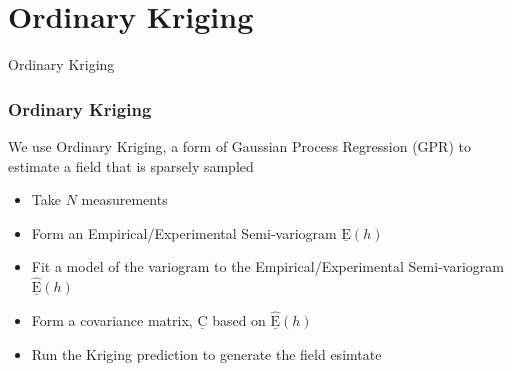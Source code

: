 \documentclass[professionalfont,10pt]{beamer}
\begin{document}
	\section{Ordinary Kriging}
	\begin{frame}[t]{Ordinary Kriging}
		\frametitle{Ordinary Kriging}
		\hskip-0.75cm
		\begin{minipage}[t]{0.2\linewidth}\vspace{-0.5cm}
			\tiny\tableofcontents[currentsection,currentsubsection,hideothersubsections,subsectionstyle=show/shaded]
		\end{minipage}
		\hfill%
		\begin{minipage}[t]{0.86\linewidth}\vspace{-0.5cm}
			We use Ordinary Kriging, a form of Gaussian Process Regression (GPR) to estimate a field that is sparsely sampled
			\begin{itemize}
				\item Take $N$ measurements
				\item Form an Empirical/Experimental Semi-variogram $\underline{\text{E}}(h)$
				\item Fit a model of the variogram to the Empirical/Experimental Semi-variogram $\underline{\hat{\text{E}}}(h)$
				\item Form a covariance matrix, $\underline{\text{C}}$ based on $\hat{\underline{\text{E}}}(h)$
				\item Run the Kriging prediction to generate the field esimtate
			\end{itemize}
		\end{minipage}
		\vfill%
	\end{frame}
\end{document}
